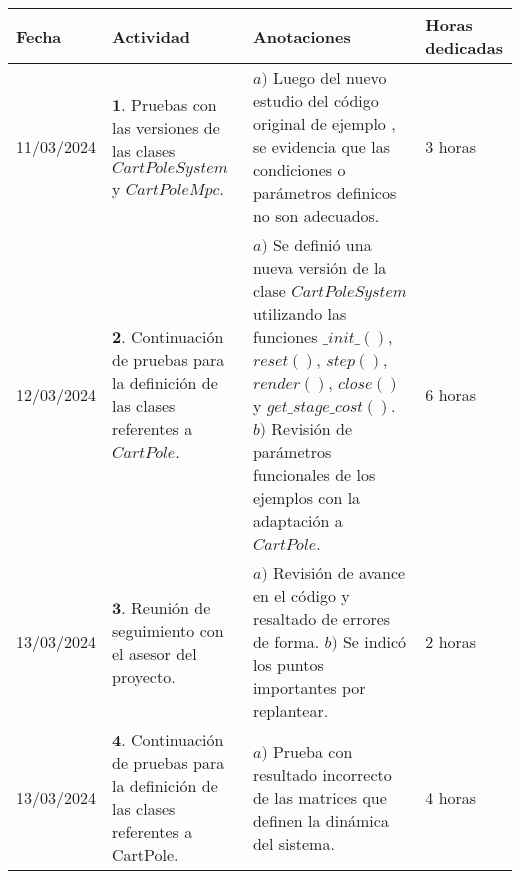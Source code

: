 \documentclass[12pt]{article}
\begin{document}
\begin{minipage}[h]{\textwidth}
	\centering
	\begin{tabularx}{\textwidth}{|p{2cm}|X|X|p{2cm}|} 
		\hline
		\rowcolor{encabezado}
		\textbf{Fecha} & 
		\textbf{Actividad} & 
		\textbf{Anotaciones} & 
		\textbf{Horas dedicadas} \\ \hline
	 	11/03/2024 & 
	 	$\mathbf{1}.$ Pruebas con las versiones de las clases $CartPoleSystem$ y $CartPoleMpc$. & 
	 	$a)$ Luego del nuevo estudio del código original de ejemplo \cite{Airdaldi2023}, se evidencia que las condiciones o parámetros definicos no son adecuados. \newline & 
	 	3 horas \\
	 	12/03/2024 & 
	 	$\mathbf{2}.$ Continuación de pruebas para la definición de las clases referentes a $CartPole$. & 
	 	$a)$ Se definió una nueva versión de la clase $CartPoleSystem$ utilizando las funciones $\_init\_()$, $reset()$, $step()$, $render()$, $close()$ y $get\_stage\_cost()$. \newline
	 	$b)$ Revisión de parámetros funcionales de los ejemplos con la adaptación a $CartPole$. \newline & 
	 	6 horas \\
	 	13/03/2024 & 
	 	$\mathbf{3}.$ Reunión de seguimiento con el asesor del proyecto. & 
	 	$a)$ Revisión de avance en el código y resaltado de errores de forma.  \newline
	 	$b)$ Se indicó los puntos importantes por replantear.  \newline & 
	 	2 horas \\
	 	13/03/2024 & 
	 	$\mathbf{4}.$ Continuación de pruebas para la definición de las clases referentes a CartPole. & 
	 	$a)$ Prueba con resultado incorrecto de las matrices que definen la dinámica del sistema. \newline & 
	 	4 horas \\
	 	
	 	\hline
	\end{tabularx}
\end{minipage}	 	
	 	
\end{document}
